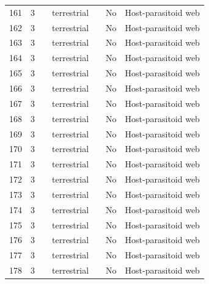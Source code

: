 \documentclass[12pt]{article}
\begin{document}
\begin{landscape}
\begin{table}[h!]
{\begin{tabular}{p{2.8cm}p{1.3cm}p{5.5cm}p{2.2cm}p{2.5cm}lp{3.5cm}}
        161   & 3 & \cite{Askew1961}     & terrestrial &       & No    & Host-parasitoid web \\
        162   & 3 & \cite{Askew1961}     & terrestrial &       & No    & Host-parasitoid web \\
        163   & 3 & \cite{Askew1961}     & terrestrial &       & No    & Host-parasitoid web \\
        164   & 3 & \cite{Askew1961}     & terrestrial &       & No    & Host-parasitoid web \\
        165   & 3 & \cite{Askew1961}     & terrestrial &       & No    & Host-parasitoid web \\
        166   & 3 & \cite{Askew1961}     & terrestrial &       & No    & Host-parasitoid web \\
        167   & 3 & \cite{Askew1961}     & terrestrial &       & No    & Host-parasitoid web \\
        168   & 3 & \cite{Hawkins1984}    & terrestrial &       & No    & Host-parasitoid web \\
        169   & 3 & \cite{Hawkins1984}    & terrestrial &       & No    & Host-parasitoid web \\        
        170   & 3 & \cite{Hawkins1984}    & terrestrial &       & No    & Host-parasitoid web \\
        171   & 3 & \cite{Hawkins1984}    & terrestrial &       & No    & Host-parasitoid web \\      
        172   & 3 & \cite{Hawkins1984}    & terrestrial &       & No    & Host-parasitoid web \\
        173   & 3 & \cite{Hawkins1984}    & terrestrial &       & No    & Host-parasitoid web \\
        174   & 3 & \cite{Hawkins1984}    & terrestrial &       & No    & Host-parasitoid web \\
        175   & 3 & \cite{Hawkins1984}    & terrestrial &       & No    & Host-parasitoid web \\
        176   & 3 & \cite{Hawkins1984}    & terrestrial &       & No    & Host-parasitoid web \\
        177   & 3 & \cite{Hawkins1984}    & terrestrial &       & No    & Host-parasitoid web \\
        178   & 3 & \cite{Hawkins1984}    & terrestrial &       & No    & Host-parasitoid web \\
        \hline
        \end{tabular}}%
      \end{table}


\end{landscape}
\end{document}
